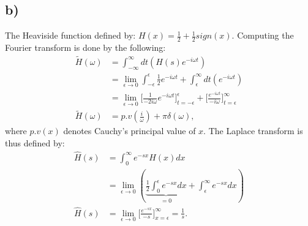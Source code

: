 \documentclass{article}
\newcommand{\w}{\omega}
\begin{document}
\subsection*{b)}
The Heaviside function defined by: $H(x) = \frac{1}{2} +\frac{1}{2}sign(x)$. Computing the Fourier transform is done by the following:
\begin{align*}
    \tilde{H}(\w) &= \int_{-\infty}^\infty dt\left(H(s)e^{-i\w t}\right)\\
    &=\lim_{\epsilon\to 0} \int_{-\epsilon}^\epsilon \frac{1}{2}e^{-i\w t} + \int_{\epsilon}^\infty dt\left( e^{-i\w t}\right)\\
    &=\lim_{\epsilon\to 0} \Bigg[\frac{1}{-2i\w}e^{-i\w t}\Bigg]_{t = -\epsilon}^\epsilon  + \Bigg[\frac{e^{-i\w t}}{-i\w}\Bigg]_{t = \epsilon}^\infty\\
    \tilde{H}(\w) &= p.v\left(\frac{i}{\w}\right) +\pi\delta(\w),
\end{align*}where $p.v(x)$ denotes Cauchy's principal value of $x$. The Laplace transform is thus defined by:
\begin{align*}
    \hat{H}(s) &= \int_0^\infty e^{-sx}H(x)dx\\
    &=\lim_{\epsilon\to0}\left(\underbrace{\frac{1}{2}\int_0^\epsilon e^{-sx}dx}_{ = 0} + \int_{\epsilon}^{\infty} e^{-sx}dx\right)\\
    \hat{H}(s)&= \lim_{\epsilon\to0}\Bigg[\frac{e^{-sx}}{-s}\Bigg]_{x = \epsilon}^{\infty} = \frac{1}{s}.
\end{align*}
\end{document}
